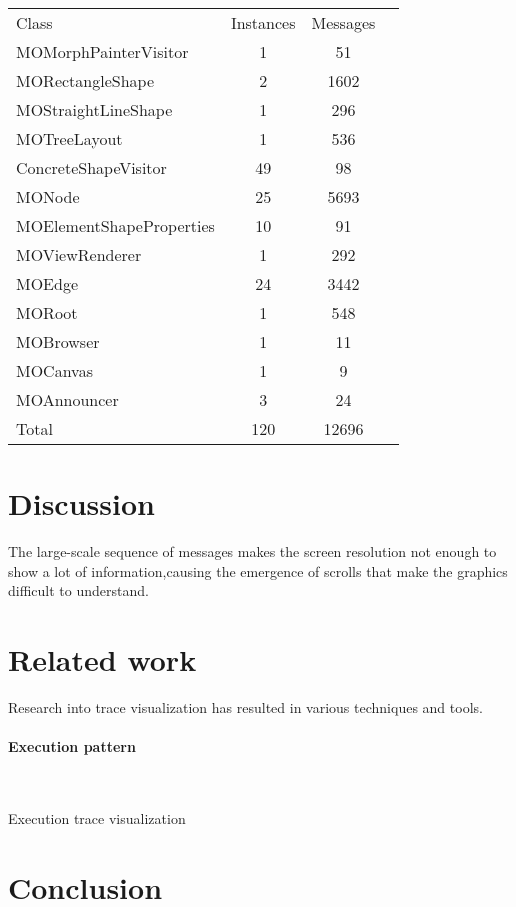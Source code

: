 \documentclass{sig-alternate}
\newcommand{\seclabel}[1]{\label{sec:#1}}
\begin{document}
\begin{center}
   \begin{tabular}{|l||ccr|} \hline
	Class & Instances & Messages \\
	MOMorphPainterVisitor & 1 & 51	\\
	MORectangleShape & 2 & 1602	\\
	MOStraightLineShape & 1 & 296	\\
	MOTreeLayout & 1 & 536	\\
	ConcreteShapeVisitor & 49 & 98 \\
	MONode & 25 & 5693\\
	MOElementShapeProperties & 10 & 91\\
	MOViewRenderer & 1 & 292\\
	MOEdge & 24 & 3442\\
	MORoot & 1 & 548\\
	MOBrowser & 1 & 11\\
	MOCanvas & 1 & 9\\
	MOAnnouncer & 3 & 24\\
	Total & 120 & 12696 \\
   \end{tabular}
\end{center}

\section{Discussion}\seclabel{discussion}

The large-scale sequence of messages makes the screen resolution not enough to show a lot of information,causing the emergence of scrolls that make the graphics difficult to understand. 



\section{Related work}\seclabel{relatedwork}

Research into trace visualization has resulted in various techniques and tools.

\paragraph{Execution pattern}~\cite{Pauw98a}

Execution trace visualization
~\cite{Maoz11a}
\section{Conclusion}\seclabel{conclusion}




\end{document}
